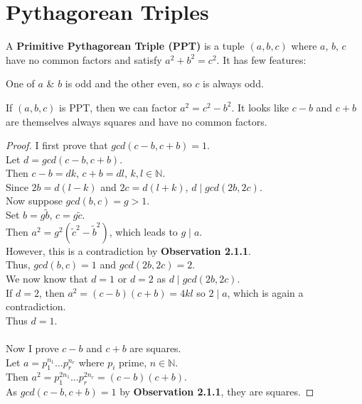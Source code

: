 \section{Pythagorean Triples}

A \textbf{Primitive Pythagorean Triple (PPT)} is a tuple $(a, b, c)$ where $a$, $b$, $c$ have no common factors and satisfy $a^{2}+b^{2}=c^{2}$. It has few features:

\begin{observation}
One of $a$ \& $b$ is odd and the other even, so $c$ is always odd.
\end{observation}

\begin{observation}
If $(a, b, c)$ is PPT, then we can factor $a^{2}=c^{2}-b^{2}$. It looks like $c - b$ and $c + b$ are themselves always squares and have no common factors.
\end{observation}

\begin{proof}
I first prove that $gcd(c - b, c + b) = 1$. \\
Let $d = gcd(c - b, c + b)$. \\ 
Then $c - b = dk$, $c + b = dl$, $k,l\in \mathbb{N}$. \\
Since $2b = d(l - k)$ and $2c = d(l + k)$, $d\mid gcd(2b, 2c)$. \\
Now suppose $gcd(b, c)= g > 1$. \\
Set $b = g\tilde{b}$, $c = g\tilde{c}$. \\
Then $a^{2} = g^{2}(\tilde{c}^{2} - \tilde{b}^{2})$, which leads to $g\mid a$. \\
However, this is a contradiction by \textbf{Observation 2.1.1}. \\
Thus, $gcd(b, c) = 1$ and $gcd(2b, 2c) = 2$. \\
We now know that $d = 1$ or $d = 2$ as $d \mid gcd(2b, 2c)$. \\
If $d = 2$, then $a^{2}=(c-b)(c+b)=4kl$ so $2\mid a$, which is again a contradiction. \\
Thus $d = 1$.\\
\\
Now I prove $c - b$ and $c + b$ are squares. \\
Let $a = p_{1}^{n_{1}}\dots p_{r}^{n_{r}}$ where $p_{i}$ prime, $n\in \mathbb{N}$. \\
Then $a^{2} = p_{1}^{2n_{1}}\dots p_{r}^{2n_{r}} = (c - b)(c + b)$. \\ 
As $gcd(c - b, c + b) = 1$ by \textbf{Observation 2.1.1}, they are squares.
\end{proof}

